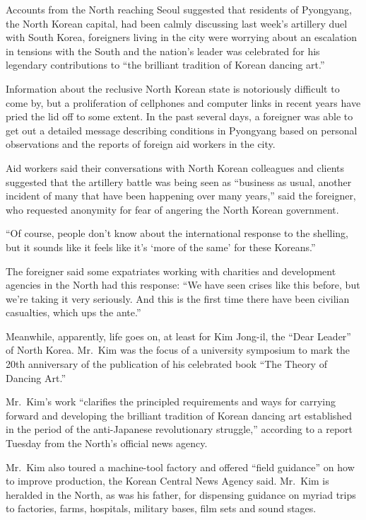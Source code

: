 ﻿\documentclass[12pt]{article}
\begin{document}
Accounts from the North reaching Seoul suggested that residents of Pyongyang, the North Korean
capital, had been calmly discussing last week's artillery duel with South Korea, foreigners living
in the city were worrying about an escalation in tensions with the South and the nation's leader was
celebrated for his legendary contributions to ``the brilliant tradition of Korean dancing art.''

Information about the reclusive North Korean state is notoriously difficult to come by, but a
proliferation of cellphones and computer links in recent years have pried the lid off to some
extent. In the past several days, a foreigner was able to get out a detailed message describing
conditions in Pyongyang based on personal observations and the reports of foreign aid workers in the
city.

Aid workers said their conversations with North Korean colleagues and clients suggested that the
artillery battle was being seen as ``business as usual, another incident of many that have been
happening over many years,'' said the foreigner, who requested anonymity for fear of angering the
North Korean government.

``Of course, people don't know about the international response to the shelling, but it sounds like
it feels like it's `more of the same' for these Koreans.''

The foreigner said some expatriates working with charities and development agencies in the North had
this response: ``We have seen crises like this before, but we're taking it very seriously. And this
is the first time there have been civilian casualties, which ups the ante.''

Meanwhile, apparently, life goes on, at least for Kim Jong-il, the ``Dear Leader'' of North Korea.
Mr.~Kim was the focus of a university symposium to mark the 20th anniversary of the publication of
his celebrated book ``The Theory of Dancing Art.''

Mr.~Kim's work ``clarifies the principled requirements and ways for carrying forward and developing
the brilliant tradition of Korean dancing art established in the period of the anti-Japanese
revolutionary struggle,'' according to a report Tuesday from the North's official news agency.

Mr.~Kim also toured a machine-tool factory and offered ``field guidance'' on how to improve
production, the Korean Central News Agency said. Mr.~Kim is heralded in the North, as was his
father, for dispensing guidance on myriad trips to factories, farms, hospitals, military bases, film
sets and sound stages.
\end{document}
